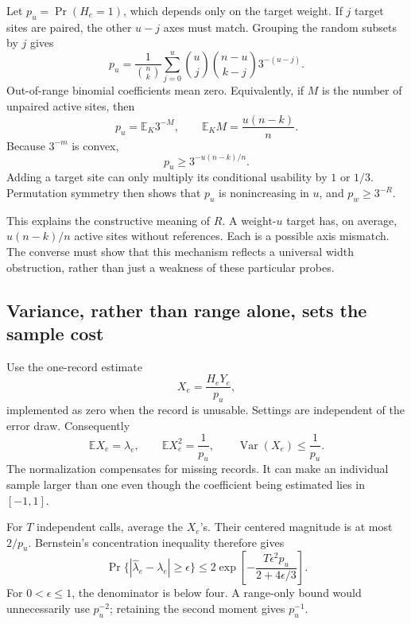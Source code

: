\documentclass[11pt,a4paper]{article}
\numberwithin{equation}{section}
\theoremstyle{definition}
\theoremstyle{remark}
\begin{document}
Let \(p_u=\Pr(H_e=1)\), which depends only on the target weight. If \(j\) target sites are paired, the other \(u-j\) axes must match. Grouping the random subsets by \(j\) gives
\begin{equation}
 p_u=
 \frac{1}{\binom nk}
 \sum_{j=0}^{u}\binom uj\binom{n-u}{k-j}3^{-(u-j)}.
 \label{eq:plmt-pu}
\end{equation}
Out-of-range binomial coefficients mean zero. Equivalently, if \(M\) is the number of unpaired active sites, then
\[
 p_u=\mathbb E_K3^{-M},\qquad \mathbb E_KM=\frac{u(n-k)}{n}.
\]
Because \(3^{-m}\) is convex,
\begin{equation}
 p_u\geq3^{-u(n-k)/n}.
 \label{eq:plmt-compatibility}
\end{equation}
Adding a target site can only multiply its conditional usability by \(1\) or \(1/3\). Permutation symmetry then shows that \(p_u\) is nonincreasing in \(u\), and \(p_w\geq3^{-R}\).

This explains the constructive meaning of \(R\). A weight-\(u\) target has, on average, \(u(n-k)/n\) active sites without references. Each is a possible axis mismatch. The converse must show that this mechanism reflects a universal width obstruction, rather than just a weakness of these particular probes.

\subsection{Variance, rather than range alone, sets the sample cost}
Use the one-record estimate
\begin{equation}
 X_e=\frac{H_eY_e}{p_u},
\end{equation}
implemented as zero when the record is unusable. Settings are independent of the error draw. Consequently
\begin{equation}
 \mathbb E X_e=\lambda_e,\qquad
 \mathbb E X_e^2=\frac1{p_u},\qquad
 \operatorname{Var}(X_e)\leq\frac1{p_u}.
 \label{eq:plmt-moments}
\end{equation}
The normalization compensates for missing records. It can make an individual sample larger than one even though the coefficient being estimated lies in \([-1,1]\).

For \(T\) independent calls, average the \(X_e\)'s. Their centered magnitude is at most \(2/p_u\). Bernstein's concentration inequality therefore gives
\begin{equation}
 \Pr\{|\widehat\lambda_e-\lambda_e|\geq\epsilon\}
 \leq
 2\exp\!\left[-\frac{T\epsilon^2p_u}{2+4\epsilon/3}\right].
 \label{eq:plmt-bernstein}
\end{equation}
For \(0<\epsilon\leq1\), the denominator is below four. A range-only bound would unnecessarily use \(p_u^{-2}\); retaining the second moment gives \(p_u^{-1}\).
\end{document}
